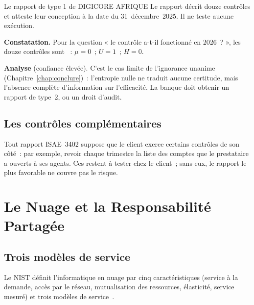 \begin{boxlecture}{Le rapport de type 1 de DIGICORE AFRIQUE}
Le rapport décrit douze contrôles et atteste leur conception à la date du
31~décembre~2025. Il ne teste aucune exécution.

\medskip
\textbf{Constatation.} Pour la question « le contrôle a-t-il fonctionné en
2026~? », les douze contrôles sont \NEK{}~: $\mu = 0$~; $U = 1$~; $H = 0$.

\medskip
\textbf{Analyse} (confiance élevée). C'est le cas limite de l'ignorance
unanime (Chapitre~\ref{chap:conclure})~: l'entropie nulle ne traduit
aucune certitude, mais l'absence complète d'information sur l'efficacité.
La banque doit obtenir un rapport de type~2, ou un droit d'audit.

\medskip
\hfill{}
\end{boxlecture}

\subsection{Les contrôles complémentaires}

Tout rapport ISAE~3402 suppose que le client exerce certains contrôles de
son côté~: par exemple, revoir chaque trimestre la liste des comptes que
le prestataire a ouverts à ses agents. Ces  restent à tester chez le
client~; sans eux, le rapport le plus favorable ne couvre pas le risque.

\section{Le Nuage et la Responsabilité Partagée}
\label{sec:c24-nuage}

\subsection{Trois modèles de service}

Le NIST définit l'informatique en nuage par cinq caractéristiques
(service à la demande, accès par le réseau, mutualisation des ressources,
élasticité, service mesuré) et trois modèles de service~\cite{nist2011sp800145}.

